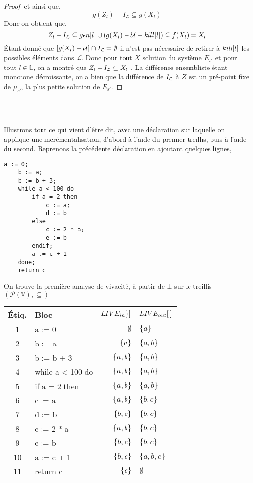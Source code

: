 \documentclass[a4paper, 10pt]{article}
\begin{document}
\begin{proof}
	et ainsi que,
	\[g(Z_l) - I_{\mathcal{L}} \subseteq g(X_l)\]
	Donc on obtient que,
	\[
		Z_l - I_{\mathcal{L}} \subseteq gen[l] \cup (g(X_l) - \mathcal{U} - kill[l]) \subseteq f(X_l) = X_l
	\]
	Étant donné que $[g(X_l) - \mathcal{U}] \cap I_{\mathcal{L}} = \emptyset$ il n'est pas nécessaire de retirer à $kill[l]$ les possibles
	éléments dans $\mathcal{L}$.
	Donc pour tout $X$ solution du système $E_{s'}$ et pour tout $l \in \mathbb{L}$, on a montré que $Z_l - I_{\mathcal{L}} \subseteq X_l$ .
	La différence ensembliste étant monotone décroissante, on a bien que la différence de $I_{\mathcal{L}}$ à $Z$
	est un pré-point fixe de $\mu_{s'}$, la plus petite solution de $E_{s'}$.
\end{proof}
\\
\\
\begin{example}
Illustrons tout ce qui vient d'être dit, avec une déclaration sur laquelle on applique une incrémentalisation, d'abord à l'aide du premier
treillis, puis à l'aide du second. Reprenons la précédente déclaration en ajoutant quelques lignes,
\begin{lstlisting}[tabsize=2]
	a := 0;
	b := a;
	b := b + 3;
	while a < 100 do
		if a = 2 then
			c := a;
			d := b
		else
			c := 2 * a;
			e := b
		endif;
		a := c + 1
	done;
	return c
\end{lstlisting}
On trouve la première analyse de vivacité, à partir de $\bot$ sur le treillis $(\mathcal{P}(\mathbb{V}), \subseteq)$
\begin{center}
	\begin{tabular}{||c|l|r|l||}
	\hline
	Étiq. & Bloc & $LIVE_{in}[\cdot]$ & $LIVE_{out}[\cdot]$ \\
	\hline
	1 & a := 0 & $\emptyset$ & $\{a\}$\\
	2 & b := a & $\{a\}$ & $\{a, b\}$\\
	3 & b := b + 3 & $\{a, b\}$ & $\{a, b\}$\\
	4 & while a < 100 do & $\{a, b\}$ & $\{a, b\}$\\
	5 & if a = 2 then & $\{a, b\}$ & $\{a, b\}$\\
	6 & c := a & $\{a, b\}$ & $\{b, c\}$\\
	7 & d := b & $\{b, c\}$ & $\{b, c\}$\\
	8 & c := 2 * a & $\{a, b\}$ & $\{b, c\}$\\
	9 & e := b & $\{b, c\}$ & $\{b, c\}$\\
	10 & a := c + 1 & $\{b, c\}$ & $\{a, b, c\}$\\
	11 & return c & $\{c\}$ & $\emptyset$\\

\end{tabular}
\end{center}
\end{example}
\end{document}
